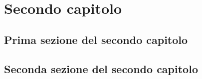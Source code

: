 \chapter{Secondo capitolo}

\section{Prima sezione del secondo capitolo}
\lipsum

\section{Seconda sezione del secondo capitolo}
\lipsum
